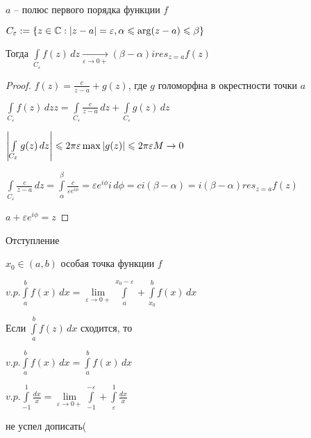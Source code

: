 \begin{lemma}[о полувычете]\thmslashn
	
	$a$ -- полюс первого порядка функции $f$
	
	$C_{\varepsilon} := \{z \in \mathbb{C}: |z - a| = \varepsilon, \alpha \leqslant \arg (z-a) \leqslant \beta\}$
	
	Тогда $\int\limits_{C_{\varepsilon}} f(z)\,dz \underset{\varepsilon\to 0+}\to (\beta -\alpha) i res_{z = a} f(z)$
	
\end{lemma}

\begin{proof}\thmslashn
	
	$f(z) = \frac{c}{z-a} + g(z)$, где $g$ голоморфна в окрестности точки $a$
	
	$\int\limits_{C_{\varepsilon}} f(z)\,dzz = \int\limits_{C_{\varepsilon}} \frac{c}{z - a} \,dz + \int\limits_{C_{\varepsilon}} g(z)\,dz$
	
	$\left|\int\limits_{C_{\varepsilon}} g(z)\,dz\right| \leqslant 2\pi \varepsilon \max|g(z)| \leqslant 2\pi \varepsilon M \to 0$
	
	$\int\limits_{C_{\varepsilon}} \frac{c}{z-a} \,dz = \int\limits_{\alpha}^{\beta} \frac{c}{\varepsilon e^{i\phi
	}} = \varepsilon e^{i\phi} i\,d\phi = ci(\beta - \alpha) = i(\beta - \alpha) res_{z= a} f(z)$
	
	$a+ \varepsilon e^{i\phi} = z$
	
\end{proof}

Отступление

\begin{definition}\thmslashn
	
	$x_0 \in (a, b)$ особая точка функции $f$
	
	$v.p. \int\limits_{a}^b f(x) \,dx = \lim\limits_{\varepsilon \to 0+} \int\limits_{a}^{x_0 - \varepsilon} + \int\limits_{x_0}^{b}f(x)\,dx$
	
\end{definition}

\begin{remark}\thmslashn

	Если $\int\limits_{a}^b f(z)\,dx$ сходится, то 
	
	$v.p. \int\limits_{a}^b f(x) \,dx = \int\limits_{a}^{b}f(x)\,dx$

\end{remark}

\begin{example}\thmslashn
	
	$v.p. \int\limits_{-1}^1\frac{dx}{x} = \lim\limits_{\varepsilon \to 0+} \int\limits_{-1}^{-\varepsilon} + \int\limits_{\varepsilon}^1 \frac{dx}{x}$
	
	\TODO не успел дописать(
	
\end{example}

